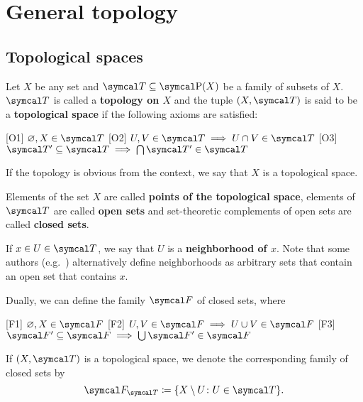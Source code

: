 \section{General topology}\label{sec:general_topology}
\subsection{Topological spaces}\label{subsec:topological_spaces}

\begin{definition}\label{def:topological_space}\cite[11]{Engelking1989}
  Let \( X \) be any set and \( \Cal{T} \subseteq \Power(X) \) be a family of subsets of \( X \). \( \Cal{T} \) is called a \textbf{topology on \( X \)} and the tuple \( (X, \Cal{T}) \) is said to be a \textbf{topological space} if the following axioms are satisfied:
  \begin{description}
    [O1] \( \varnothing, X \in \Cal{T} \)
    [O2] \( U, V \in \Cal{T} \implies U \cap V \in \Cal{T} \)
    [O3] \( \Cal{T}' \subseteq \Cal{T} \implies \bigcap \Cal{T}' \in \Cal{T} \)
  \end{description}

  If the topology is obvious from the context, we say that \( X \) is a topological space.

  Elements of the set \( X \) are called \textbf{points of the topological space}, elements of \( \Cal{T} \) are called \textbf{open sets} and set-theoretic complements of open sets are called \textbf{closed sets}.

  If \( x \in U \in \Cal{T} \), we say that \( U \) is a \textbf{neighborhood of \( x \)}. Note that some authors (e.g.~\cite[38]{Kelley1955}) alternatively define neighborhoods as arbitrary sets that contain an open set that contains \( x \).

  Dually, we can define the family \( \Cal{F} \) of closed sets, where
  \begin{description}
    [F1] \( \varnothing, X \in \Cal{F} \)
    [F2] \( U, V \in \Cal{F} \implies U \cup V \in \Cal{F} \)
    [F3] \( \Cal{F}' \subseteq \Cal{F} \implies \bigcup \Cal{F}' \in \Cal{F} \)
  \end{description}

  If \( (X, \Cal{T}) \) is a topological space, we denote the corresponding family of closed sets by
  \begin{equation*}
    \Cal{F}_{\Cal{T}} \coloneqq \{ X \setminus U \colon U \in \Cal{T} \}.
  \end{equation*}
\end{definition}

